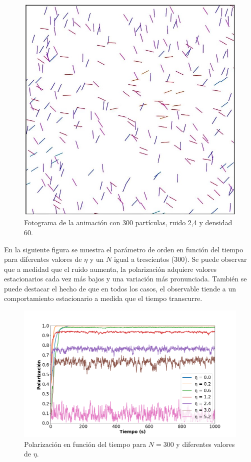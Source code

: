 \documentclass[11pt, a4paper]{article}
\begin{document}
            \begin{figure}[h]
                \centering
                \includegraphics[width=\textwidth]{./animation-n300-eta2p4-frame}
                \caption{Fotograma de la animación con 300 partículas, ruido 2,4 y densidad 60.}
                \label{fig:parametro_orden_1}
            \end{figure}

            En la siguiente figura se muestra el parámetro de orden en función del tiempo para diferentes valores de $\eta$
            y un $N$ igual a trescientos (300). Se puede observar que a medidad que el ruido aumenta, la polarización
            adquiere valores estacionarios cada vez más bajos y una variación más pronunciada. También se puede destacar
            el hecho de que en todos los casos, el observable tiende a un comportamiento estacionario a medida que el tiempo
            transcurre.

            \begin{figure}[h]
                \centering
                \includegraphics[width=\textwidth]{./va_vs_time-n300}
                \caption{Polarización en función del tiempo para $N=300$ y diferentes valores de $\eta$.}
                \label{fig:parametro_orden_2}
            \end{figure}
\end{document}
